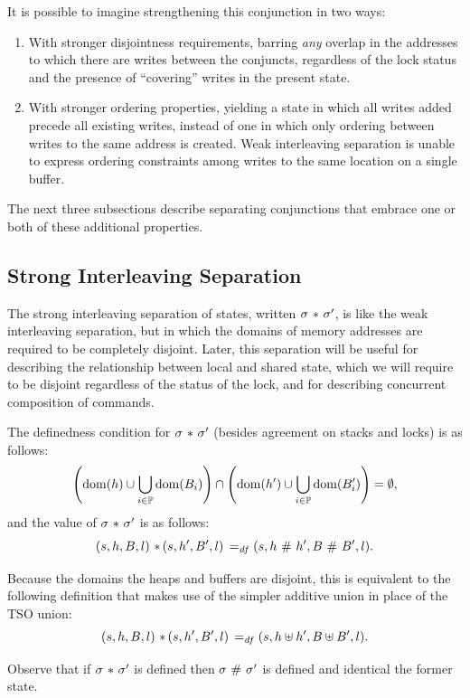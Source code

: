 \documentclass[11pt]{report}
\begin{document}
It is possible to imagine strengthening this conjunction in two ways: \begin{enumerate}
  \item With stronger disjointness requirements, barring \emph{any} overlap in the addresses to which there are writes between the conjuncts, regardless of the lock status and the presence of ``covering'' writes in the present state.  
  
  \item With stronger ordering properties, yielding a state in which all writes added precede all existing writes, instead of one in which only ordering between writes to the same address is created. Weak interleaving separation is unable to express ordering constraints among writes to the same location on a single buffer. 
\end{enumerate}

The next three subsections describe separating conjunctions that embrace one or both of these additional properties. 

\subsection{Strong Interleaving Separation}

The strong interleaving separation of states, written $\sigma \operatorname{\,\ast\,} \sigma'$, is like the weak interleaving separation, but in which the domains of memory addresses are required to be completely disjoint. Later, this separation will be useful for describing the relationship between local and shared state, which we will require to be disjoint regardless of the status of the lock, and for describing concurrent composition of commands.

 The definedness condition for $\sigma \operatorname{\,\ast\,} \sigma'$ (besides agreement on stacks and locks) is as follows: \[ \left(\operatorname{\mathrm{dom}}(h) \cup \bigcup_{i \in \mathbb{P}} \operatorname{\mathrm{dom}}(B_i) \right) \cap \left( \operatorname{\mathrm{dom}}(h') \cup \bigcup_{i \in \mathbb{P}} \operatorname{\mathrm{dom}}(B'_i)\right) = \operatorname{\emptyset}, \] and the value of $\sigma \operatorname{\,\ast\,} \sigma'$ is as follows: \[ (s,h,B,l) \operatorname{\,\ast\,} (s,h',B',l) \operatorname{\;=_{\mathit{df}}\;} (s,h\operatorname{\,\#\,} h',B\operatorname{\,\#\,} B',l).\] 

Because the domains the heaps and buffers are disjoint, this is equivalent to the following definition that makes use of the simpler additive union in place of the TSO union: \[ (s,h,B,l) \operatorname{\,\ast\,} (s,h',B',l) \operatorname{\;=_{\mathit{df}}\;} (s,h\uplus h',B\uplus B',l).\] 

Observe that if $\sigma \operatorname{\,\ast\,} \sigma'$ is defined then $\sigma \operatorname{\,\#\,} \sigma'$ is defined and identical the former state. 
\end{document}
